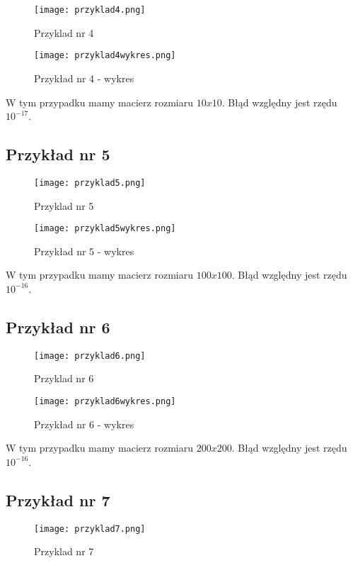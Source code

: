 \documentclass{article}
\begin{document}
\begin{figure}[H]
  \caption{Przyklad nr 4}
  \centering
  \texttt{[image: przyklad4.png]}
\end{figure}

\begin{figure}[H]
  \caption{Przykład nr 4 - wykres}
  \centering
  \texttt{[image: przyklad4wykres.png]}
\end{figure}

W tym przypadku mamy macierz rozmiaru \(10x10\). Błąd względny jest rzędu \(10^{-17}\).
 
\subsection{Przykład nr 5}

\begin{figure}[H]
  \caption{Przyklad nr 5}
  \centering
  \texttt{[image: przyklad5.png]}
\end{figure}

\begin{figure}[H]
  \caption{Przykład nr 5 - wykres}
  \centering
  \texttt{[image: przyklad5wykres.png]}
\end{figure}

W tym przypadku mamy macierz rozmiaru \(100x100\). Błąd względny jest rzędu \(10^{-16}\).

\subsection{Przykład nr 6}

\begin{figure}[H]
  \caption{Przyklad nr 6}
  \centering
  \texttt{[image: przyklad6.png]}
\end{figure}

\begin{figure}[H]
  \caption{Przykład nr 6 - wykres}
  \centering
  \texttt{[image: przyklad6wykres.png]}
\end{figure}

W tym przypadku mamy macierz rozmiaru \(200x200\). Błąd względny jest rzędu \(10^{-16}\).

\subsection{Przykład nr 7}

\begin{figure}[H]
  \caption{Przyklad nr 7}
  \centering
  \texttt{[image: przyklad7.png]}
\end{figure}
\end{document}
